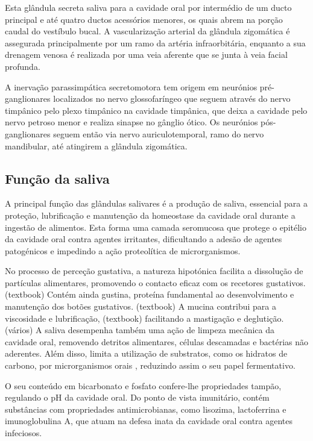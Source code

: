 Esta glândula secreta saliva para a cavidade oral por intermédio de um ducto principal e até quatro ductos acessórios menores, os quais abrem na porção caudal do vestíbulo bucal. \cite{lobprise_oral_2019}
A vascularização arterial da glândula zigomática é assegurada principalmente por um ramo da artéria infraorbitária, enquanto a sua drenagem venosa é realizada por uma veia aferente que se junta à veia facial profunda. \cite{evans_millers_2012}

A inervação parassimpática secretomotora tem origem em neurónios pré- ganglionares localizados no nervo glossofaríngeo que seguem através do nervo timpânico pelo plexo timpânico na cavidade timpânica, que deixa a cavidade pelo nervo petroso menor e realiza sinapse no gânglio ótico. Os neurónios pós-ganglionares seguem então via nervo auriculotemporal, ramo do nervo mandibular, até atingirem a glândula zigomática. \cite{evans_millers_2012}

\subsection{Função da saliva}

A principal função das glândulas salivares é a produção de saliva, essencial para a proteção, lubrificação e manutenção da homeostase da cavidade oral durante a ingestão de alimentos. Esta forma uma camada seromucosa que protege o epitélio da cavidade oral contra agentes irritantes, dificultando a adesão de agentes patogénicos e impedindo a ação proteolítica de microrganismos.  


No processo de perceção gustativa, a natureza hipotónica facilita a dissolução de partículas alimentares, promovendo o contacto eficaz com os recetores gustativos. (textbook) Contém ainda gustina, proteína fundamental ao desenvolvimento e manutenção dos botões gustativos. (textbook) A mucina contribui para a viscosidade e lubrificação, (textbook) facilitando a mastigação e deglutição. (vários) 
A saliva desempenha também uma ação de limpeza mecânica da cavidade oral, removendo detritos alimentares, células descamadas e bactérias não aderentes. Além disso, limita a utilização de substratos, como os hidratos de carbono, por microrganismos orais , reduzindo assim o seu papel fermentativo.


O seu conteúdo em bicarbonato e fosfato confere-lhe propriedades tampão, regulando o pH da cavidade oral.
Do ponto de vista imunitário, contém substâncias com propriedades antimicrobianas, como lisozima, lactoferrina e imunoglobulina A, que atuam na defesa inata da cavidade oral contra agentes infeciosos. \cite{Mescher2018}


